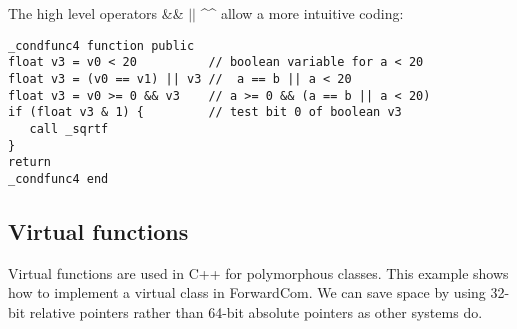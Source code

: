 \documentclass[forwardcom.tex]{subfiles}
\begin{document}
The high level operators \&\& $||$ \^{}\^{} allow a more intuitive coding:

\begin{example}
\label{exampleBooleanOperations4}
\end{example}
\begin{lstlisting}[frame=single]
_condfunc4 function public
float v3 = v0 < 20          // boolean variable for a < 20
float v3 = (v0 == v1) || v3 //  a == b || a < 20
float v3 = v0 >= 0 && v3    // a >= 0 && (a == b || a < 20)
if (float v3 & 1) {         // test bit 0 of boolean v3
   call _sqrtf
}
return
_condfunc4 end
\end{lstlisting}
\vspace{4mm}


\subsection{Virtual functions} \label{virtualFunctions}
Virtual functions are used in C++ for polymorphous classes.
This example shows how to implement a virtual class in ForwardCom.
We can save space by using 32-bit relative pointers rather than 64-bit absolute pointers as other systems do.
\vv
\end{document}
